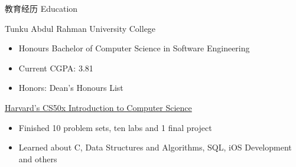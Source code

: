 \documentclass{article}
\newlength{\tabin}
\newlength{\secsep}
\newcommand{\lineunder}{\vspace*{-8pt} \\ \hspace*{-6pt} \hrulefill \\ \vspace*{-15pt}}
\newenvironment{tabbedsection}[1]{
  \begin{list}{}{
      \setlength{\itemsep}{0pt}
      \setlength{\labelsep}{0pt}
      \setlength{\labelwidth}{0pt}
      \setlength{\leftmargin}{\tabin}
      \setlength{\rightmargin}{\tabin}
      \setlength{\listparindent}{0pt}
      \setlength{\parsep}{0pt}
      \setlength{\parskip}{0pt}
      \setlength{\partopsep}{0pt}
      \setlength{\topsep}{#1}
    }
  \item[]
}{\end{list}}
\newenvironment{resume_section}[1]{
  \filbreak
  \vspace{2\secsep}
  \textsc{\large#1}
  \lineunder
  \begin{tabbedsection}{\secsep}
}{\end{tabbedsection}}
\newenvironment{resume_subsection}[2][]{
  \textbf{#2} \hfill {\footnotesize #1} \hspace{2em}
  \begin{tabbedsection}{0.5\secsep}
}{\end{tabbedsection}}
\newenvironment{subitems}{
  \renewcommand{\labelitemi}{-}
  \begin{itemize}
      \setlength{\labelsep}{1em}
}{\end{itemize}}
\begin{document}
\begin{resume_section}{教育经历 Education}
  \begin{resume_subsection}{Tunku Abdul Rahman University College}
    \begin{subitems}
      \item Honours Bachelor of Computer Science in Software Engineering
      \item Current CGPA: 3.81
      \item Honors: Dean's Honours List
    \end{subitems}
  \end{resume_subsection}

  \begin{resume_subsection}[线上 (2020--2021)]{\href{https://drive.google.com/file/d/1-tVq-vD20YwCcI3YgotgKKe_UYvHTwBj/view?usp=sharing}{Harvard's CS50x Introduction to Computer Science}}
    \begin{subitems}
      \item Finished 10 problem sets, ten labs and 1 final project
      \item Learned about C, Data Structures and Algorithms, SQL, iOS Development and others
    \end{subitems}
  \end{resume_subsection}
\end{resume_section}
\end{document}

